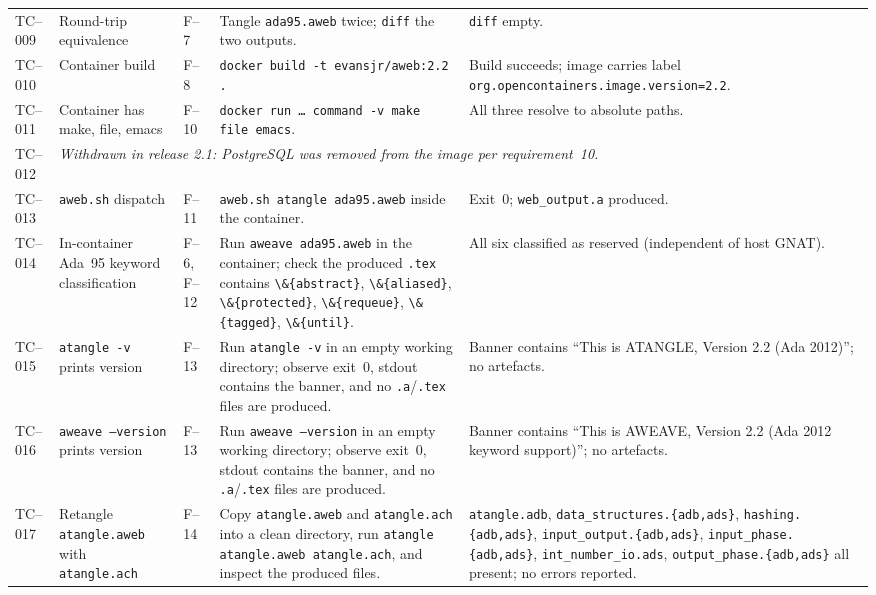 \documentclass[11pt]{article}
\begin{document}
{\begin{longtable}{@{}lp{3.5cm}lp{4.6cm}p{4.0cm}@{}}
TC--009 & Round-trip equivalence & F--7 &
Tangle \texttt{ada95.aweb} twice; \texttt{diff} the two outputs. &
\texttt{diff} empty.\\

TC--010 & Container build & F--8 &
\texttt{docker build -t evansjr/aweb:2.2 .} &
Build succeeds; image carries label
\texttt{org.opencontainers.image.version=2.2}.\\

TC--011 & Container has make, file, emacs & F--10 &
\texttt{docker run \dots\ command -v make file emacs}. &
All three resolve to absolute paths.\\

TC--012 & \multicolumn{4}{l}{\emph{Withdrawn in release 2.1: PostgreSQL
was removed from the image per requirement~10.}}\\

TC--013 & \texttt{aweb.sh} dispatch & F--11 &
\texttt{aweb.sh atangle ada95.aweb} inside the container. &
Exit~0; \texttt{web\_output.a} produced.\\

TC--014 & In-container Ada~95 keyword classification & F--6, F--12 &
Run \texttt{aweave ada95.aweb} in the container; check the produced
\texttt{.tex} contains \verb|\&{abstract}|, \verb|\&{aliased}|,
\verb|\&{protected}|, \verb|\&{requeue}|, \verb|\&{tagged}|,
\verb|\&{until}|. &
All six classified as reserved (independent of host GNAT).\\

TC--015 & \texttt{atangle -v} prints version & F--13 &
Run \texttt{atangle -v} in an empty working directory; observe
exit~0, stdout contains the banner, and no \texttt{.a}/\texttt{.tex}
files are produced. &
Banner contains
``This is ATANGLE, Version 2.2 (Ada 2012)''; no artefacts.\\

TC--016 & \texttt{aweave --version} prints version & F--13 &
Run \texttt{aweave --version} in an empty working directory; observe
exit~0, stdout contains the banner, and no \texttt{.a}/\texttt{.tex}
files are produced. &
Banner contains
``This is AWEAVE, Version 2.2 (Ada 2012 keyword support)'';
no artefacts.\\

TC--017 & Retangle \texttt{atangle.aweb} with \texttt{atangle.ach} & F--14 &
Copy \texttt{atangle.aweb} and \texttt{atangle.ach} into a clean
directory, run \texttt{atangle atangle.aweb atangle.ach}, and inspect
the produced files. &
\texttt{atangle.adb}, \texttt{data\_structures.\{adb,ads\}},
\texttt{hashing.\{adb,ads\}}, \texttt{input\_output.\{adb,ads\}},
\texttt{input\_phase.\{adb,ads\}}, \texttt{int\_number\_io.ads},
\texttt{output\_phase.\{adb,ads\}} all present; no errors reported.\\


\end{longtable}}
\end{document}

